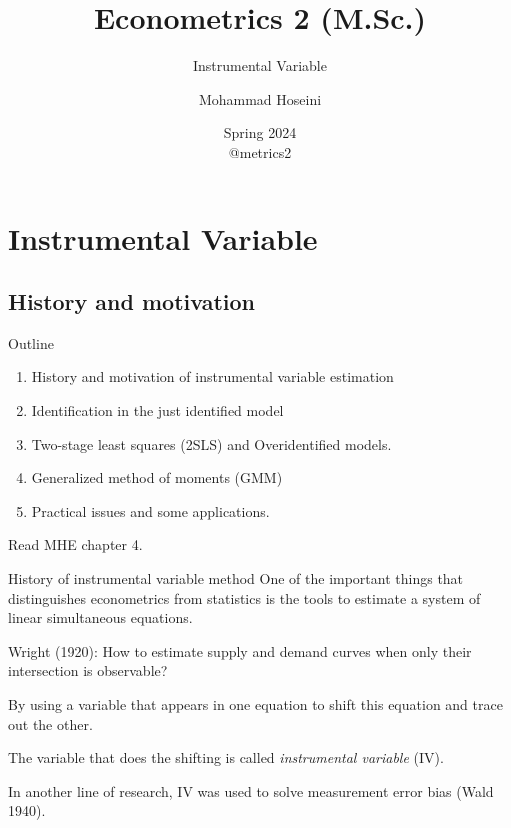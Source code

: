 \documentclass{beamer}
\begin{document}
	\title[Econometrics 2]{Econometrics 2 (M.Sc.)}
	\subtitle{Instrumental Variable}
	\author[Mohammad Hoseini]{Mohammad Hoseini}
	
	
	
\date[Spring 2024]{Spring 2024 \\
	\vspace{10pt} @metrics2
}

	
\begin{frame}[plain]
	\titlepage
\end{frame}

\section{Instrumental Variable}
\subsection{History and motivation}

\begin{frame}{Outline}

\begin{enumerate}
	\item History and motivation of instrumental variable estimation
	\item Identification in the just identified model
	\item Two-stage least squares (2SLS) and Overidentified models.
	\item Generalized method of moments (GMM)
	\item Practical issues and some applications.
\end{enumerate}\bigskip

Read MHE chapter 4.
\end{frame}

\begin{frame}{History of instrumental variable method}
One of the important things that distinguishes econometrics from statistics is the tools to estimate a system of linear simultaneous equations.\bigskip

Wright (1920): How to estimate supply and demand curves when only their intersection is observable?\medskip

By using a variable that appears in one equation to shift this equation and trace out the other.\bigskip\pause

The variable that does the shifting is called \textit{instrumental variable} (IV).\bigskip

In another line of research, IV was used to solve measurement error bias (Wald 1940).

\end{frame}
\end{document}

